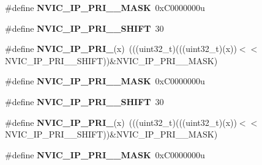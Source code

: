 \begin{DoxyCompactItemize}
\item 
\mbox{\label{group___n_v_i_c___register___masks_ga49365dc3aff91af04da530f7f6bec195}} 
\#define {\bfseries N\+V\+I\+C\+\_\+\+I\+P\+\_\+\+P\+R\+I\+\_\+\_\+\+M\+A\+SK}~0x\+C0000000u
\item 
\mbox{\label{group___n_v_i_c___register___masks_gaa85a48e57435dc20f2f4addac07495fb}} 
\#define {\bfseries N\+V\+I\+C\+\_\+\+I\+P\+\_\+\+P\+R\+I\+\_\+\_\+\+S\+H\+I\+FT}~30
\item 
\mbox{\label{group___n_v_i_c___register___masks_gad899ec0e9af2c1f5ef93f54a31e97b3c}} 
\#define {\bfseries N\+V\+I\+C\+\_\+\+I\+P\+\_\+\+P\+R\+I\+\_}(x)~(((uint32\+\_\+t)(((uint32\+\_\+t)(x))$<$$<$N\+V\+I\+C\+\_\+\+I\+P\+\_\+\+P\+R\+I\+\_\+\_\+\+S\+H\+I\+FT))\&N\+V\+I\+C\+\_\+\+I\+P\+\_\+\+P\+R\+I\+\_\+\_\+\+M\+A\+SK)
\item 
\mbox{\label{group___n_v_i_c___register___masks_ga61474f269718967669f977cab7bd1390}} 
\#define {\bfseries N\+V\+I\+C\+\_\+\+I\+P\+\_\+\+P\+R\+I\+\_\+\_\+\+M\+A\+SK}~0x\+C0000000u
\item 
\mbox{\label{group___n_v_i_c___register___masks_ga9cf132334a204ff4f6a55bc12ed41853}} 
\#define {\bfseries N\+V\+I\+C\+\_\+\+I\+P\+\_\+\+P\+R\+I\+\_\+\_\+\+S\+H\+I\+FT}~30
\item 
\mbox{\label{group___n_v_i_c___register___masks_ga6fe13510b74dae85eb25fefc7eaed7dd}} 
\#define {\bfseries N\+V\+I\+C\+\_\+\+I\+P\+\_\+\+P\+R\+I\+\_}(x)~(((uint32\+\_\+t)(((uint32\+\_\+t)(x))$<$$<$N\+V\+I\+C\+\_\+\+I\+P\+\_\+\+P\+R\+I\+\_\+\_\+\+S\+H\+I\+FT))\&N\+V\+I\+C\+\_\+\+I\+P\+\_\+\+P\+R\+I\+\_\+\_\+\+M\+A\+SK)
\item 
\mbox{\label{group___n_v_i_c___register___masks_gae8ec204dbf1e1b4cb8231ae35dd8c9e9}} 
\#define {\bfseries N\+V\+I\+C\+\_\+\+I\+P\+\_\+\+P\+R\+I\+\_\+\_\+\+M\+A\+SK}~0x\+C0000000u
\item 
\mbox{\label{group___n_v_i_c___register___masks_gac90bf47a30adde534ef2a3ab6b79f77f}} 

\end{DoxyCompactItemize}
